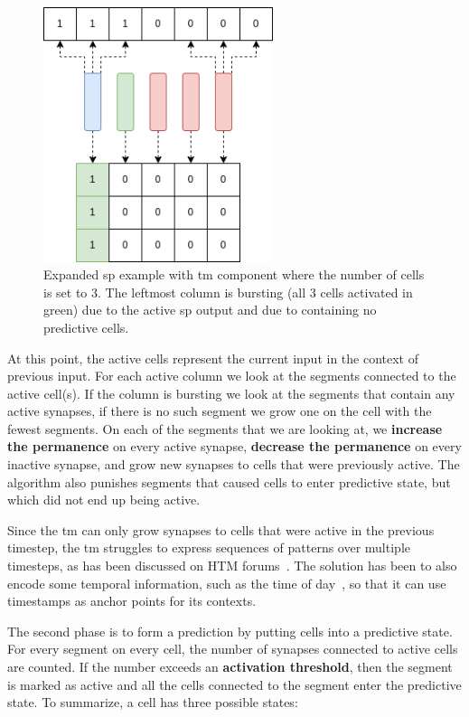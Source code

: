 \par
\begin{figure}[H]
    \centering
    \includegraphics[width=0.6\textwidth]{resources/related_works/tm_vis1.png}
    \caption[Temporal Memory Workings]{Expanded \gls*{sp} example with \gls*{tm} component where the number of cells is set to 3. The leftmost column is bursting (all 3 cells activated in green) due to the active \gls*{sp} output and due to containing no predictive cells.}
    \label{fig:tm_vis1}
\end{figure}
At this point, the active cells represent the current input in the context of previous input. For each active column we look at the segments connected to the active cell(s). If the column is bursting we look at the segments that contain any active synapses, if there is no such segment we grow one on the cell with the fewest segments. On each of the segments that we are looking at, we \textbf{increase the permanence} on every active synapse, \textbf{decrease the permanence} on every inactive synapse, and grow new synapses to cells that were previously active. The algorithm also punishes segments that caused cells to enter predictive state, but which did not end up being active.
\par
Since the \gls*{tm} can only grow synapses to cells that were active in the previous timestep, the \gls*{tm} struggles to express sequences of patterns over multiple timesteps, as has been discussed on HTM forums~\cite{tm_sequence_problem}. The solution has been to also encode some temporal information, such as the time of day~\cite{AHMAD2017134,tm_sequence_problem}, so that it can use timestamps as anchor points for its contexts.
\par
The second phase is to form a prediction by putting cells into a predictive state. For every segment on every cell, the number of synapses connected to active cells are counted. If the number exceeds an \textbf{activation threshold}, then the segment is marked as active and all the cells connected to the segment enter the predictive state. To summarize, a cell has three possible states:

